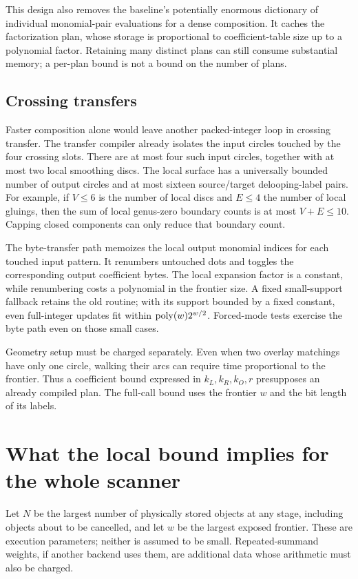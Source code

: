 This design also removes the baseline's potentially enormous dictionary
of individual monomial-pair evaluations for a dense composition. It caches
the factorization plan, whose storage is proportional to coefficient-table
size up to a polynomial factor. Retaining many distinct plans can still
consume substantial memory; a per-plan bound is not a bound on the number
of plans.

\subsection{Crossing transfers}

Faster composition alone would leave another packed-integer loop in
crossing transfer. The transfer compiler already isolates the input
circles touched by the four crossing slots. There are at most four such
input circles, together with at most two local smoothing discs. The local
surface has a universally bounded number of output circles and at most
sixteen source/target delooping-label pairs. For example, if $V\leq6$ is
the number of local discs and $E\leq4$ the number of local gluings, then
the sum of local genus-zero boundary counts is at most $V+E\leq10$.
Capping closed components can only reduce that boundary count.

The byte-transfer path memoizes the local output monomial indices for
each touched input pattern. It renumbers untouched dots and toggles the
corresponding output coefficient bytes. The local expansion factor is a
constant, while renumbering costs a polynomial in the frontier size. A
fixed small-support fallback retains the old routine; with its support
bounded by a fixed constant, even full-integer updates fit within
$\operatorname{poly}(w)2^{w/2}$. Forced-mode tests exercise the byte path even on those
small cases.

Geometry setup must be charged separately. Even when two overlay
matchings have only one circle, walking their arcs can require time
proportional to the frontier. Thus a coefficient bound expressed in
$k_L,k_R,k_O,r$ presupposes an already compiled plan. The full-call bound
uses the frontier $w$ and the bit length of its labels.

\section{What the local bound implies for the whole scanner}
\label{sec:global}

Let $N$ be the largest number of physically stored objects at any stage,
including objects about to be cancelled, and let $w$ be the largest exposed
frontier. These are execution parameters; neither is assumed to be small.
Repeated-summand weights, if another backend uses them, are additional
data whose arithmetic must also be charged.

